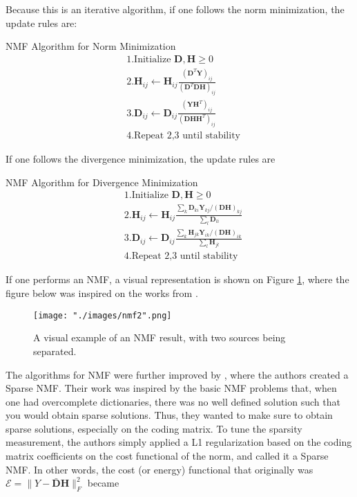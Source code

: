 Because this is an iterative algorithm, if one follows the norm minimization, the update rules are:

\begin{codebox}
NMF Algorithm for Norm Minimization
\begin{align*}
    &1. \text{Initialize }\bm{D,H} \geq 0 \\
    &2. \bm{H}_{ij} \leftarrow \bm{H}_{ij} \frac{ (\bm{D}^T \bm{Y})_{ij} }{ (\bm{D}^T \bm{D} \bm{H})_{ij} } \\
    &3. \bm{D}_{ij} \leftarrow \bm{D}_{ij} \frac{ (\bm{Y} \bm{H}^T)_{ij} }{ (\bm{D}\bm{H}\bm{H}^T)_{ij} } \\
    &4. \text{Repeat 2,3 until stability}
\end{align*}
\end{codebox}

If one follows the divergence minimization, the update rules are
\begin{codebox}
NMF Algorithm for Divergence Minimization
\begin{align*}
    &1. \text{Initialize }\bm{D,H} \geq 0 \\
    &2. \bm{H}_{ij} \leftarrow \bm{H}_{ij} \frac{ \sum_k \bm{D}_{ki} \bm{Y}_{kj} / (\bm{DH})_{kj} }{ \sum_l \bm{D}_{li} } \\
    &3. \bm{D}_{ij} \leftarrow \bm{D}_{ij} \frac{ \sum_k \bm{H}_{jk} \bm{Y}_{ik} / (\bm{DH})_{ik} }{ \sum_l \bm{H}_{jl} } \\
    &4. \text{Repeat 2,3 until stability}
\end{align*}
\end{codebox}

If one performs an NMF, a visual representation is shown on Figure \ref{fig::nmf_example}, where the figure below was inspired on the works from \cite{singlechannel}.

\begin{figure}[H]
\begin{center}
    \texttt{[image: "./images/nmf2".png]}
    \caption{A visual example of an NMF result, with two sources being separated.}
    \label{fig::nmf_example}
\end{center}
\end{figure}


The algorithms for NMF were further improved by \cite{sparsenmf}, where the authors created a Sparse NMF. Their work was inspired by the basic NMF problems that, when one had overcomplete dictionaries, there was no well defined solution such that you would obtain sparse solutions. Thus, they wanted to make sure to obtain sparse solutions, especially on the coding matrix. To tune the sparsity measurement, the authors simply applied a L1 regularization based on the coding matrix coefficients on the cost functional of the norm, and called it a Sparse NMF. In other words, the cost (or energy) functional that originally was $\mathcal{E} = \| Y - \bar{\bm{D}} \bm{H} \|_F^2$ became

